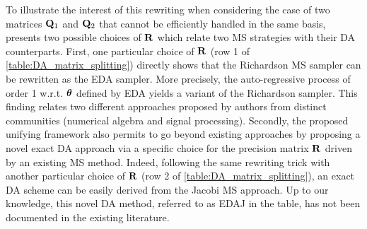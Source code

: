 \documentclass[nohypdvips,onefignum,onetabnum]{siamart171218}
\begin{document}
To illustrate the interest of this rewriting when considering the case of two matrices $\mathbf{Q}_1$ and $\mathbf{Q}_2$ that cannot be efficiently handled in the same basis,  presents two possible choices of $\mathbf{R}$ which relate two MS strategies with their DA counterparts. 
%
First, one particular choice of $\mathbf{R}$ (row 1 of \cref{table:DA_matrix_splitting}) directly shows that the Richardson MS sampler can be rewritten as the EDA sampler. More precisely, the auto-regressive process of order 1 w.r.t. $\boldsymbol{\theta}$ defined by EDA yields a variant of the Richardson sampler.
This finding relates two different approaches proposed by authors from distinct communities (numerical algebra and signal processing).
Secondly, the proposed unifying framework also permits to go beyond existing approaches by proposing a novel exact DA approach via a specific choice for the precision matrix $\mathbf{R}$ driven by an existing MS method. Indeed, following the same rewriting trick with another particular choice of $\mathbf{R}$ (row 2 of \cref{table:DA_matrix_splitting}), an exact DA scheme can be easily derived from the Jacobi MS approach. Up to our knowledge, this novel DA method, referred to as EDAJ in the table, has not been documented in the existing literature. 
\end{document}

